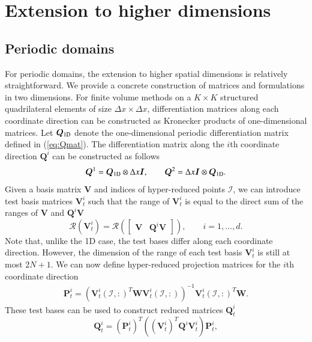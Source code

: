 \documentclass[preprint,10pt]{elsarticle}
\theoremstyle{definition}
\theoremstyle{lemma}
\theoremstyle{theorem}
\theoremstyle{assumption}
\newcommand{\LRp}[1]{\left( #1 \right)}
\begin{document}
\section{Extension to higher dimensions}
\label{sec:7}

\subsection{Periodic domains}
For periodic domains, the extension to higher spatial dimensions is relatively straightforward.  We provide a concrete construction of matrices and formulations in two dimensions.  For finite volume methods on a $K \times K$ structured quadrilateral elements of size $\Delta x \times \Delta x$, differentiation matrices along each coordinate direction can be constructed as Kronecker products of one-dimensional matrices.  Let $\bm{Q}_{\rm 1D}$ denote the one-dimensional periodic differentiation matrix defined in (\ref{eq:Qmat}).  The differentiation matrix along the $i$th coordinate direction $\bm{Q}^i$ can be constructed as follows
\[
\bm{Q}^1 = \bm{Q}_{\rm 1D}\otimes \Delta x \bm{I}, \qquad \bm{Q}^2 = \Delta x\bm{I} \otimes \bm{Q}_{\rm 1D}.
\]
Given a basis matrix $\bm{V}$ and indices of hyper-reduced points $\mathcal{I}$, we can introduce test basis matrices $\bm{V}^i_t$ such that the range of  $\bm{V}^i_t$ is equal to the direct sum of the ranges of $\bm{V}$ and $\bm{Q}^i\bm{V}$
\[
\mathcal{R}\LRp{\bm{V}^i_t} = \mathcal{R}\LRp{\begin{bmatrix}\bm{V} &\bm{Q}^i\bm{V}\end{bmatrix}}, \qquad i = 1,\ldots,d.
\]
Note that, unlike the 1D case, the test bases differ along each coordinate direction.  However, the dimension of the range of each test basis $\bm{V}_t^i$ is still at most $2N+1$.  
We can now define hyper-reduced projection matrices for the $i$th coordinate direction
\begin{align*}
\bm{P}^i_t = \LRp{\bm{V}^i_t\LRp{\mathcal{I},:}^T\bm{W}\bm{V}^i_t\LRp{\mathcal{I},:}}^{-1}\bm{V}^i_t\LRp{\mathcal{I},:}^T\bm{W}.%
\end{align*}
These test bases can be used to construct reduced matrices $\bm{Q}_t^i$ %
\[
\bm{Q}_t^i = \LRp{\bm{P}^i_t}^T\LRp{\LRp{\bm{V}^i_t}^T\bm{Q}^i\bm{V}^i_t}\bm{P}^i_t,
\]
\end{document}
